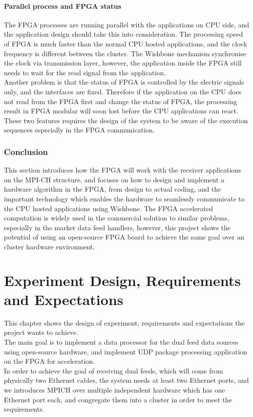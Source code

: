 \documentclass[11pt,openright,a4paper]{report}
\begin{document}
\subsubsection{Parallel process and FPGA status}
The FPGA processes are running parallel with the applications on CPU side, and the application design should take this into consideration. The processing speed of FPGA is much faster than the normal CPU hosted applications, and the clock frequency is different between the cluster. The Wishbone mechanism synchronise the clock via transmission layer, however, the application inside the FPGA still needs to wait for the read signal from the application.\\
Another problem is that the status of FPGA is controlled by the electric signals only, and the interfaces are fixed. Therefore if the application on the CPU does not read from the FPGA first and change the status of FPGA, the processing result in FPGA modular will soon lost before the CPU applications can react.\\
These two features requires the design of the system to be aware of the execution sequences especially in the FPGA communication.\\
\subsection{Conclusion}
This section introduces how the FPGA will work with the receiver applications on the MPI-CH structure, and focuses on how to design and implement a hardware algorithm in the FPGA, from design to actual coding, and the important technology which enables the hardware to seamlessly communicate to the CPU hosted applications using Wishbone. The FPGA accelerated computation is widely used in the commercial solution to similar problems, especially in the market data feed handlers, however, this project shows the potential of using an open-source FPGA board to achieve the same goal over an cluster hardware environment.\\ 
\chapter{Experiment Design, Requirements and Expectations}
This chapter shows the design of experiment, requirements and expectations the project wants to achieve. \\
The main goal is to implement a data processor for the dual feed data sources using open-source hardware, and implement UDP package processing application on the FPGA for acceleration.\\
In order to achieve the goal of receiving dual feeds, which will come from physically two Ethernet cables, the system needs at least two Ethernet ports, and we introduces MPICH over multiple independent hardware which has one Ethernet port each, and congregate them into a cluster in order to meet the requirements.\\
\newpage
\end{document}
